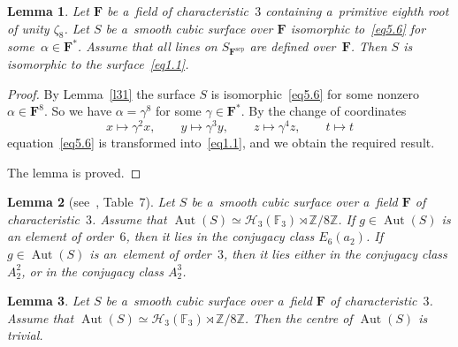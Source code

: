 \documentclass{amsart}
\numberwithin{equation}{section}
\theoremstyle{plain}
\newtheorem{lemma}{Lemma}
\theoremstyle{definition}
\theoremstyle{remark}
\begin{document}
\begin{lemma}
\label{l32}
Let $\mathbf{F}$ be a~field of characteristic~$3$ containing a~primitive eighth root of unity $\zeta_8$. Let $S$ be a~smooth cubic surface over $\mathbf{F}$ isomorphic to~\eqref{eq5.6} for some~\mbox{$\alpha \in \mathbf{F}^*$.} Assume that all lines on $S_{\mathbf{F}^{\mathrm{sep}}}$ are defined over~$\mathbf{F}$. Then $S$ is isomorphic to the surface~\eqref{eq1.1}.
\end{lemma}

\begin{proof}
By Lemma~\ref{l31} the surface $S$ is isomorphic~\eqref{eq5.6} for some nonzero $\alpha \in \mathbf{F}^8$. So we have $\alpha = \gamma^8$ for some $\gamma \in \mathbf{F}^*$. By the change of coordinates
$$
x \mapsto \gamma^2 x, \qquad y \mapsto \gamma^3 y, \qquad z \mapsto \gamma^4 z, \qquad t \mapsto t
$$
equation~\eqref{eq5.6} is transformed into~\eqref{eq1.1}, and we obtain the required result.

The lemma is proved.
\end{proof}

\begin{lemma}[{see~\cite{8}, Table~7}]
\label{l33}
Let $S$ be a~smooth cubic surface over a~field $\mathbf{F}$ of characteristic~$3$. Assume that $\operatorname{Aut}(S) \simeq \mathcal{H}_3(\mathbb{F}_3) \rtimes \mathbb{Z}/8\mathbb{Z}$. If $g \in \operatorname{Aut}(S)$ is an element of order~$6$, then it lies in the conjugacy class $E_6(a_2)$. If $g \in \operatorname{Aut}(S)$ is an~element of order~$3$, then it lies either in the conjugacy class $A_2^2$, or in the conjugacy class $A_2^3$.
\end{lemma}

\begin{lemma}
\label{l34}
Let $S$ be a~smooth cubic surface over a~field $\mathbf{F}$ of characteristic~$3$. Assume that $\operatorname{Aut}(S) \simeq \mathcal{H}_3(\mathbb{F}_3) \rtimes \mathbb{Z}/8\mathbb{Z}$. Then the centre of $\operatorname{Aut}(S)$ is trivial.
\end{lemma}
\end{document}
